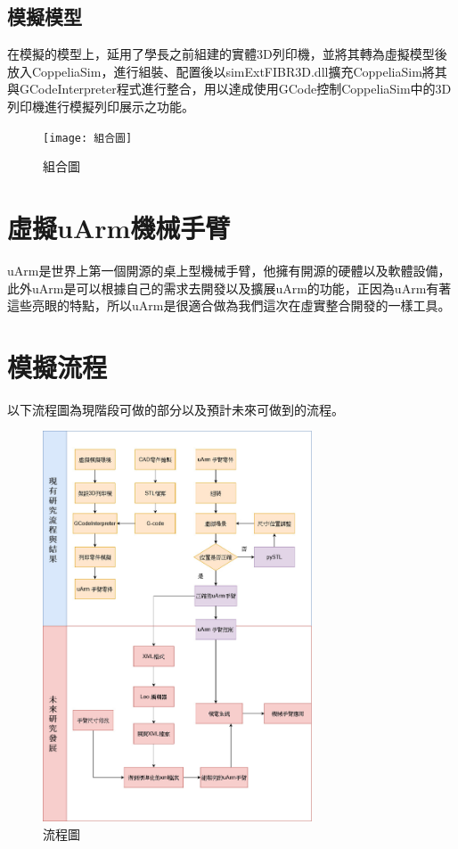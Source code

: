  \subsection{模擬模型}
 在模擬的模型上，延用了學長之前組建的實體3D列印機，並將其轉為虛擬模型後放入CoppeliaSim，進行組裝、配置後以simExtFIBR3D.dll擴充CoppeliaSim將其與GCodeInterpreter程式進行整合，用以達成使用GCode控制CoppeliaSim中的3D列印機進行模擬列印展示之功能。\\
\begin{figure}[hbt!]
\center
\texttt{[image: 組合圖]}
\caption{\Large 組合圖}
\label{組合圖}
\end{figure}

\section{虛擬uArm機械手臂}

uArm是世界上第一個開源的桌上型機械手臂，他擁有開源的硬體以及軟體設備，此外uArm是可以根據自己的需求去開發以及擴展uArm的功能，正因為uArm有著這些亮眼的特點，所以uArm是很適合做為我們這次在虛實整合開發的一樣工具。\\
\section{模擬流程}

以下流程圖為現階段可做的部分以及預計未來可做到的流程。\\

\begin{figure}[hbt!]
\begin{center}
\includegraphics[width=8cm]{虛擬環境的流程圖}
\caption{\Large 流程圖}\label{虛擬環境的流程圖}
\end{center}
\end{figure}


